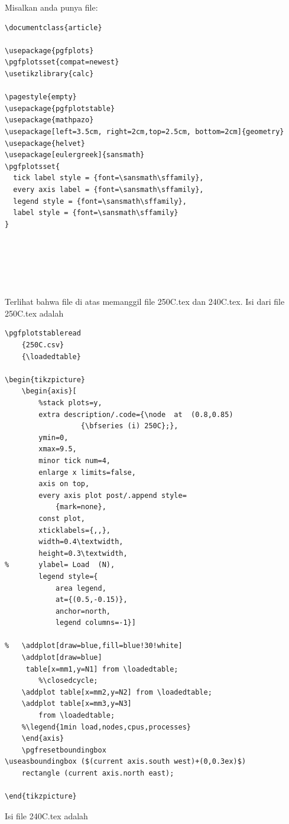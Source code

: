 Misalkan anda punya file:
\begin{verbatim}
\documentclass{article}

\usepackage{pgfplots}
\pgfplotsset{compat=newest}
\usetikzlibrary{calc}

\pagestyle{empty}
\usepackage{pgfplotstable}
\usepackage{mathpazo}
\usepackage[left=3.5cm, right=2cm,top=2.5cm, bottom=2cm]{geometry}
\usepackage{helvet}
\usepackage[eulergreek]{sansmath}
\pgfplotsset{
  tick label style = {font=\sansmath\sffamily},
  every axis label = {font=\sansmath\sffamily},
  legend style = {font=\sansmath\sffamily},
  label style = {font=\sansmath\sffamily}
}






\end{verbatim}
Terlihat bahwa file di atas memanggil
file 250C.tex dan 240C.tex.
Isi dari file 250C.tex adalah
\begin{verbatim}
\pgfplotstableread
	{250C.csv}
	{\loadedtable}

\begin{tikzpicture}
	\begin{axis}[
	    %stack plots=y,
	    extra description/.code={\node  at  (0.8,0.85) 
                  {\bfseries (i) 250C};},
		ymin=0,
		xmax=9.5,
		minor tick num=4,
		enlarge x limits=false,
		axis on top,
		every axis plot post/.append style=
			{mark=none},
		const plot,
		xticklabels={,,},
		width=0.4\textwidth,
		height=0.3\textwidth,
%		ylabel= Load  (N),
		legend style={
			area legend,
			at={(0.5,-0.15)},
			anchor=north,
			legend columns=-1}]

%	\addplot[draw=blue,fill=blue!30!white]
	\addplot[draw=blue]
	 table[x=mm1,y=N1] from \loadedtable;
		%\closedcycle;
	\addplot table[x=mm2,y=N2] from \loadedtable;
	\addplot table[x=mm3,y=N3] 
		from \loadedtable;
	%\legend{1min load,nodes,cpus,processes}
	\end{axis}
	\pgfresetboundingbox
\useasboundingbox ($(current axis.south west)+(0,0.3ex)$)
    rectangle (current axis.north east);

\end{tikzpicture}
\end{verbatim}
Isi file 240C.tex adalah
